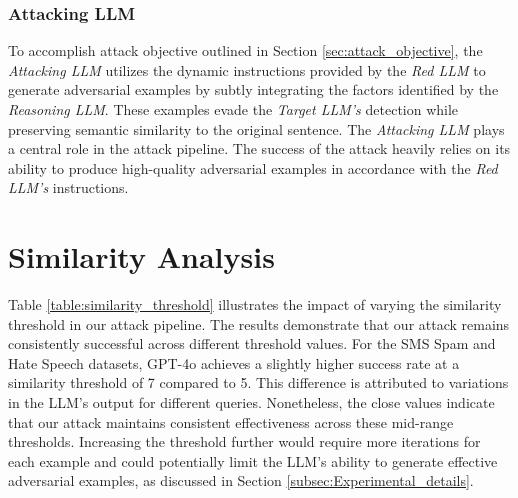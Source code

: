 \documentclass[11pt]{article}
\begin{document}
\subsubsection{Attacking LLM}
To accomplish attack objective  outlined in Section \ref{sec:attack_objective}, the \textsl{Attacking LLM} utilizes the dynamic instructions provided by the \textsl{Red LLM} to generate adversarial examples by subtly integrating the factors identified by the \textsl{Reasoning LLM}. These examples evade the \textsl{Target LLM's} detection while preserving semantic similarity to the original sentence. The \textsl{Attacking LLM} plays a central role in the attack pipeline. The success of the attack heavily relies on its ability to produce high-quality adversarial examples in accordance with the \textsl{Red LLM's} instructions.

\section{Similarity Analysis}
\label{similarity_analysis}

\begin{table}[ht!]
\centering
\small
{}
\caption{Attack Success Rate (\%) at different Similarity Thresholds}
\label{table:similarity_threshold}
\end{table}

Table \ref{table:similarity_threshold} illustrates the impact of varying the similarity threshold in our attack pipeline. The results demonstrate that our attack remains consistently successful across different threshold values. For the SMS Spam and Hate Speech datasets, GPT-4o achieves a slightly higher success rate at a similarity threshold of 7 compared to 5. This difference is attributed to variations in the LLM's output for different queries. Nonetheless, the close values indicate that our attack maintains consistent effectiveness across these mid-range thresholds. Increasing the threshold further would require more iterations for each example and could potentially limit the LLM's ability to generate effective adversarial examples, as discussed in Section \ref{subsec:Experimental_details}.
\end{document}
